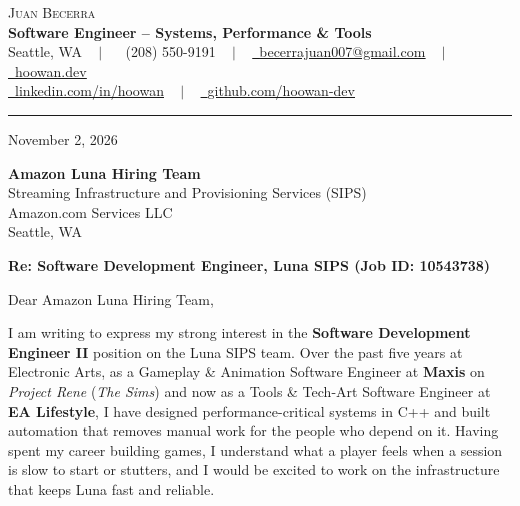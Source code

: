 \documentclass[letterpaper,11pt]{article}
\begin{document}
\begin{center}
    {\Huge \scshape Juan Becerra} \\ \vspace{4pt}
    \textbf{\large Software Engineer -- Systems, Performance \& Tools} \\ \vspace{4pt}
    \small Seattle, WA ~ $|$ ~
    \raisebox{-0.1\height}\faPhone\ (208) 550-9191 ~ $|$ ~
    \href{mailto:becerrajuan007@gmail.com}{\raisebox{-0.2\height}\faEnvelope\ \underline{becerrajuan007@gmail.com}} ~ $|$ ~
    \href{https://hoowan.dev}{\raisebox{-0.2\height}\faGlobe\ \underline{hoowan.dev}} \\ \vspace{2pt}
    \href{https://linkedin.com/in/hoowan/}{\raisebox{-0.2\height}\faLinkedin\ \underline{linkedin.com/in/hoowan}} ~ $|$ ~
    \href{https://github.com/hoowan-dev}{\raisebox{-0.2\height}\faGithub\ \underline{github.com/hoowan-dev}}
\end{center}

\vspace{4pt}
\hrule
\vspace{14pt}

\noindent November 2, 2026

\vspace{8pt}
\noindent \textbf{Amazon Luna Hiring Team} \\
Streaming Infrastructure and Provisioning Services (SIPS) \\
Amazon.com Services LLC \\
Seattle, WA

\vspace{8pt}
\noindent \textbf{Re: Software Development Engineer, Luna SIPS (Job ID: 10543738)}

\vspace{8pt}
\noindent Dear Amazon Luna Hiring Team,

I am writing to express my strong interest in the \textbf{Software Development Engineer II} position on the
Luna SIPS team. Over the past five years at Electronic Arts, as a Gameplay \& Animation Software Engineer at
\textbf{Maxis} on \emph{Project Rene} (\emph{The Sims}) and now as a Tools \& Tech-Art Software Engineer at
\textbf{EA Lifestyle}, I have designed performance-critical systems in C++ and built automation that removes
manual work for the people who depend on it. Having spent my career building games, I understand what a
player feels when a session is slow to start or stutters, and I would be excited to work on the
infrastructure that keeps Luna fast and reliable.
\end{document}
